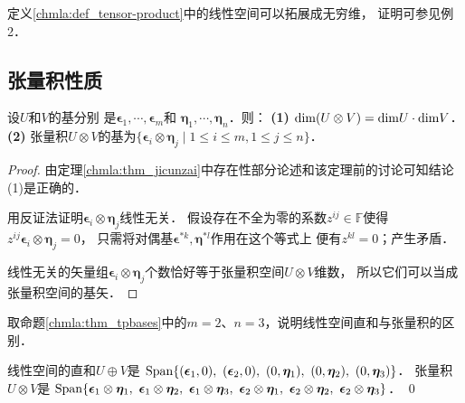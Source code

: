 定义\ref{chmla:def_tensor-product}中的线性空间可以拓展成无穷维，
证明可参见\parencite[\S 11.2.2]{qiuws-2019-v2}例2．

\subsection{张量积性质}

\begin{proposition}\label{chmla:thm_tpbases}
    设$U$和$V$的基分别
    是$\boldsymbol{\epsilon}_1, \cdots, \boldsymbol{\epsilon}_m$和
    $\boldsymbol{\eta}_1, \cdots, \boldsymbol{\eta}_n$．则：
    {\bfseries (1)} ${\rm dim} (U\otimes V)= {\rm dim} U \cdot {\rm dim} V$．
    {\bfseries (2)} 张量积$U\otimes V$的基为$\{\boldsymbol{\epsilon}_i \otimes \boldsymbol{\eta}_j \mid
    1 \leqslant i \leqslant m, 1\leqslant j\leqslant n \}$．
\end{proposition}
\begin{proof}
    由定理\ref{chmla:thm_jicunzai}中存在性部分论述和该定理前的讨论可知结论(1)是正确的．

    用反证法证明$\boldsymbol{\epsilon}_i \otimes \boldsymbol{\eta}_j$线性无关．
    假设存在不全为零的系数$z^{ij}\in \mathbb{F}$使得
    $z^{ij}\boldsymbol{\epsilon}_i \otimes \boldsymbol{\eta}_j =0$，
    只需将对偶基$\boldsymbol{\epsilon}^{*k}, \boldsymbol{\eta}^{*l}$作用在这个等式上
    便有$z^{kl}=0$；产生矛盾．

    线性无关的矢量组$\boldsymbol{\epsilon}_i \otimes \boldsymbol{\eta}_j$个数恰好等于张量积空间$U\otimes V$维数，
    所以它们可以当成张量积空间的基矢．
\end{proof}

\begin{example}
    取命题\ref{chmla:thm_tpbases}中的$m=2$、$n=3$，说明线性空间直和与张量积的区别．
\end{example}

线性空间的直和$U\oplus V$是
${\rm Span}\{(\boldsymbol{\epsilon}_1,0),\  (\boldsymbol{\epsilon}_2,0), \ 
(0,\boldsymbol{\eta}_1),\ (0,\boldsymbol{\eta}_2),\ (0,\boldsymbol{\eta}_3)\}$．
张量积$U\otimes V$是
${\rm Span}\{\boldsymbol{\epsilon}_1 \otimes \boldsymbol{\eta}_1,\ 
\boldsymbol{\epsilon}_1 \otimes \boldsymbol{\eta}_2,\ 
\boldsymbol{\epsilon}_1 \otimes \boldsymbol{\eta}_3,\ 
\boldsymbol{\epsilon}_2 \otimes \boldsymbol{\eta}_1,\ 
\boldsymbol{\epsilon}_2 \otimes \boldsymbol{\eta}_2,\ 
\boldsymbol{\epsilon}_2 \otimes \boldsymbol{\eta}_3\}$．
\qed



